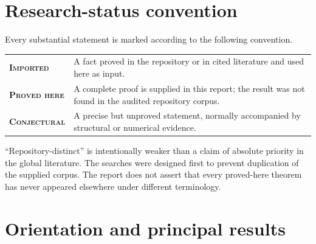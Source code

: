 \documentclass[11pt,oneside]{article}
\theoremstyle{definition}
\theoremstyle{remark}
\newcommand{\Imported}{\textcolor{linkblue}{\textsc{Imported}}}
\newcommand{\ProvedHere}{\textcolor{statusgreen}{\textsc{Proved here}}}
\newcommand{\Conjectural}{\textcolor{statusred}{\textsc{Conjectural}}}
\begin{document}
\begin{abstract}
Finally, an exact logarithmic-coordinate representation and rigorous endpoint
bounds are derived for the Stein kernel.  They lead to a Lambert--$W$-compatible
asymptotic conjecture
\[
 \tau(1-\delta)\sim \frac{\delta}{1+\delta F'(\delta)/F(\delta)}
 \qquad (\delta\downarrow0),
\]
and to a program involving multiplicative concavity, factor-divisor rigidity,
Stein spectral asymptotics, strict log-concavity for the nonbinary family, and
Lean formalization.  A fully commented Python program and reproducible numerical
certificates accompany the report.

\end{abstract}

\section*{Research-status convention}
Every substantial statement is marked according to the following convention.

\begin{center}
\begin{tabularx}{0.92\textwidth}{>{\bfseries}l X}
\toprule
\Imported & A fact proved in the repository or in cited literature and used here as input.\\
\ProvedHere & A complete proof is supplied in this report; the result was not found in the audited repository corpus.\\
\Conjectural & A precise but unproved statement, normally accompanied by structural or numerical evidence.\\
\bottomrule
\end{tabularx}
\end{center}

``Repository-distinct'' is intentionally weaker than a claim of absolute priority
in the global literature.  The searches were designed first to prevent duplication
of the supplied corpus.  The report does not assert that every proved-here theorem
has never appeared elsewhere under different terminology.

\tableofcontents
\listoffigures


\section{Orientation and principal results}
\end{document}
